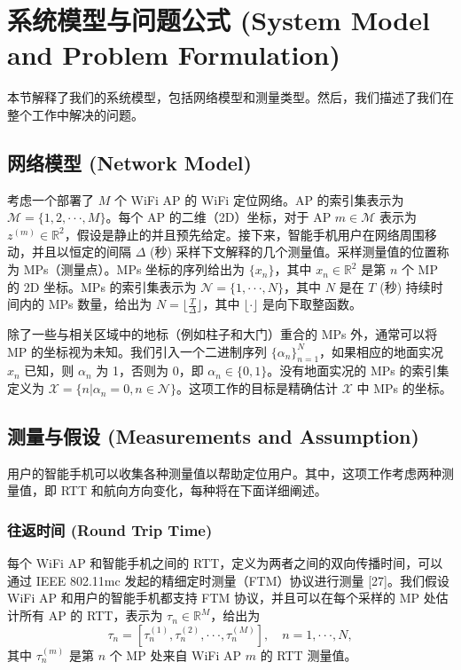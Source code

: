 \documentclass[journal]{IEEEtran}
\begin{document}
\section{系统模型与问题公式 (System Model and Problem Formulation)}
本节解释了我们的系统模型，包括网络模型和测量类型。然后，我们描述了我们在整个工作中解决的问题。

\subsection{网络模型 (Network Model)}
考虑一个部署了 $M$ 个 WiFi AP 的 WiFi 定位网络。AP 的索引集表示为 $\mathcal{M}=\{1,2,\cdot\cdot\cdot,M\}$。每个 AP 的二维（2D）坐标，对于 AP $m\in\mathcal{M}$ 表示为 $z^{(m)}\in\mathbb{R}^{2}$，假设是静止的并且预先给定。接下来，智能手机用户在网络周围移动，并且以恒定的间隔 $\Delta$ (秒) 采样下文解释的几个测量值。采样测量值的位置称为 MPs（测量点）。MPs 坐标的序列给出为 $\{x_{n}\}$，其中 $x_{n}\in\mathbb{R}^{2}$ 是第 $n$ 个 MP 的 2D 坐标。MPs 的索引集表示为 $\mathcal{N}=\{1,\cdot\cdot\cdot,N\}$，其中 $N$ 是在 $T$ (秒) 持续时间内的 MPs 数量，给出为 $N=\lfloor\frac{T}{\Delta}\rfloor$，其中 $\lfloor\cdot\rfloor$ 是向下取整函数。

除了一些与相关区域中的地标（例如柱子和大门）重合的 MPs 外，通常可以将 MP 的坐标视为未知。我们引入一个二进制序列 $\{\alpha_{n}\}_{n=1}^{N}$，如果相应的地面实况 $x_{n}$ 已知，则 $\alpha_{n}$ 为 1，否则为 0，即 $\alpha_{n}\in\{0,1\}$。没有地面实况的 MPs 的索引集定义为 $\mathcal{X}=\{n|\alpha_{n}=0,n\in\mathcal{N}\}$。这项工作的目标是精确估计 $\mathcal{X}$ 中 MPs 的坐标。

\subsection{测量与假设 (Measurements and Assumption)}
用户的智能手机可以收集各种测量值以帮助定位用户。其中，这项工作考虑两种测量值，即 RTT 和航向方向变化，每种将在下面详细阐述。

\subsubsection{往返时间 (Round Trip Time)}
每个 WiFi AP 和智能手机之间的 RTT，定义为两者之间的双向传播时间，可以通过 IEEE 802.11mc 发起的精细定时测量（FTM）协议进行测量 [27]。我们假设 WiFi AP 和用户的智能手机都支持 FTM 协议，并且可以在每个采样的 MP 处估计所有 AP 的 RTT，表示为 $\tau_{n}\in\mathbb{R}^{M}$，给出为
\begin{equation}
\tau_{n}=[\tau_{n}^{(1)},\tau_{n}^{(2)},\cdot\cdot\cdot,\tau_{n}^{(M)}], \quad n=1,\cdot\cdot\cdot,N, \label{eq:1}
\end{equation}
其中 $\tau_{n}^{(m)}$ 是第 $n$ 个 MP 处来自 WiFi AP $m$ 的 RTT 测量值。
\end{document}
